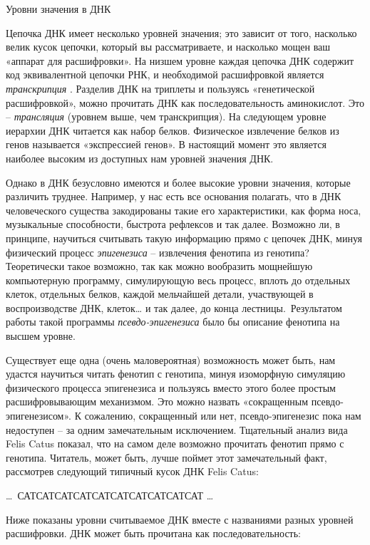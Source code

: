 \documentclass[../main.tex]{subfiles}
\begin{document}
Уровни значения в ДНК

Цепочка ДНК имеет несколько уровней значения; это зависит от того, насколько велик кусок цепочки, который вы рассматриваете, и насколько мощен ваш «аппарат для расшифровки». На низшем уровне каждая цепочка ДНК содержит код эквивалентной цепочки РНК, и необходимой расшифровкой является \emph{транскрипция} . Разделив ДНК на триплеты и пользуясь «генетической расшифровкой», можно прочитать ДНК как последовательность аминокислот. Это \--- \emph{трансляция} (уровнем выше, чем транскрипция). На следующем уровне иерархии ДНК читается как набор белков. Физическое извлечение белков из генов называется «экспрессией генов». В настоящий момент это является наиболее высоким из доступных нам уровней значения ДНК.

Однако в ДНК безусловно имеются и более высокие уровни значения, которые различить труднее. Например, у нас есть все основания полагать, что в ДНК человеческого существа закодированы такие его характеристики, как форма носа, музыкальные способности, быстрота рефлексов и так далее. Возможно ли, в принципе, научиться считывать такую информацию прямо с цепочек ДНК, минуя физический процесс \emph{эпигенезиса} \--- извлечения фенотипа из генотипа? Теоретически такое возможно, так как можно вообразить мощнейшую компьютерную программу, симулирующую весь процесс, вплоть до отдельных клеток, отдельных белков, каждой мельчайшей детали, участвующей в воспроизводстве ДНК, клеток\ldots{} и так далее, до конца лестницы.~Результатом работы такой программы \emph{псевдо-эпигенезиса} было бы описание фенотипа на высшем уровне.

Существует еще одна (очень маловероятная) возможность может быть, нам удастся научиться читать фенотип с генотипа, минуя изоморфную симуляцию физического процесса эпигенезиса и пользуясь вместо этого более простым расшифровывающим механизмом. Это можно назвать «сокращенным псевдо-эпигенезисом». К сожалению, сокращенный или нет, псевдо-эпигенезис пока нам недоступен \--- за одним замечательным исключением. Тщательный анализ вида Felis Catus показал, что на самом деле возможно прочитать фенотип прямо с генотипа. Читатель, может быть, лучше поймет этот замечательный факт, рассмотрев следующий типичный кусок ДНК Felis Catus:

\ldots~САТСАТСАТСАТСАТСАТСАТСАТСАТСАТ \ldots{}

Ниже показаны уровни считываемое ДНК вместе с названиями разных уровней расшифровки. ДНК может быть прочитана как последовательность:
\end{document}
